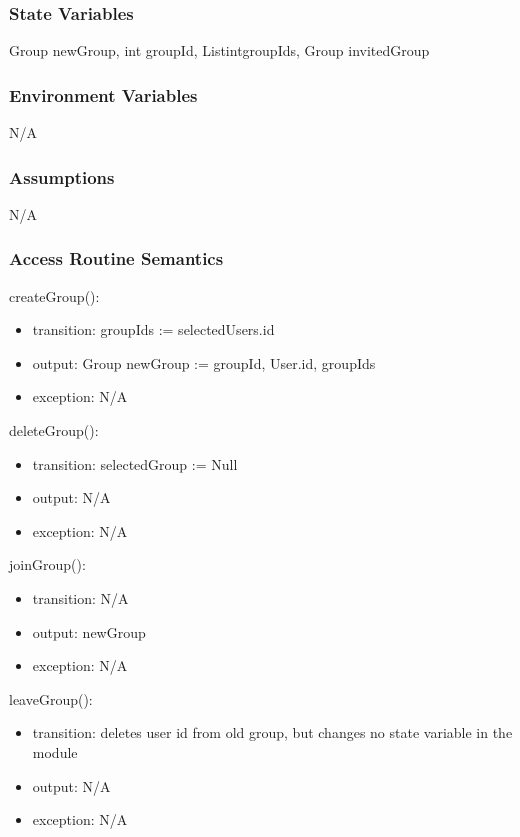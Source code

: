 \documentclass[12pt, titlepage]{article}
\begin{document}
\subsubsection{State Variables}
Group newGroup, int groupId, List\textlangle int\textrangle groupIds, Group invitedGroup

\subsubsection{Environment Variables}
N/A

\subsubsection{Assumptions}
N/A

\subsubsection{Access Routine Semantics}

\noindent createGroup():
\begin{itemize}
\item transition: groupIds := selectedUsers.id
\item output: Group newGroup := groupId, User.id, groupIds
\item exception: N/A
\end{itemize}

\noindent deleteGroup():
\begin{itemize}
\item transition: selectedGroup := Null
\item output: N/A
\item exception: N/A
\end{itemize}

\noindent joinGroup():
\begin{itemize}
\item transition: N/A
\item output: newGroup
\item exception: N/A
\end{itemize}

\noindent leaveGroup():
\begin{itemize}
\item transition: deletes user id from old group, but changes no state variable in the module
\item output: N/A
\item exception: N/A
\end{itemize}
\end{document}
